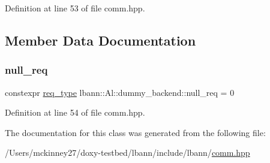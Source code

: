 Definition at line 53 of file comm.\+hpp.



\subsection{Member Data Documentation}
\mbox{\label{classlbann_1_1Al_1_1dummy__backend_a458ac4eb9f62b06984b4ef1b1eeb5851}} 
\subsubsection{\texorpdfstring{null\+\_\+req}{null\_req}}
{\footnotesize\ttfamily constexpr \hyperlink{classlbann_1_1Al_1_1dummy__backend_a9386c505d856d41c37d23e4293c11f2f}{req\+\_\+type} lbann\+::\+Al\+::dummy\+\_\+backend\+::null\+\_\+req = 0\hspace{0.3cm}{\ttfamily [static]}}



Definition at line 54 of file comm.\+hpp.



The documentation for this class was generated from the following file\+:\begin{DoxyCompactItemize}
\item 
/\+Users/mckinney27/doxy-\/testbed/lbann/include/lbann/\hyperlink{comm_8hpp}{comm.\+hpp}\end{DoxyCompactItemize}
